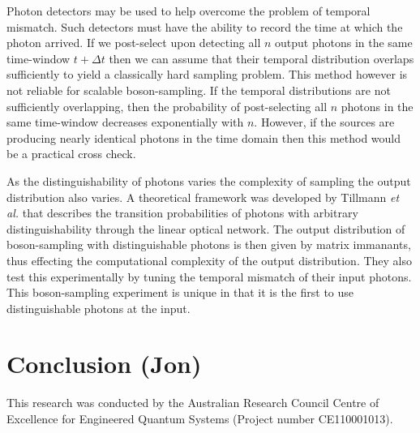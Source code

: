 \documentclass[aps,pra,twocolumn,amsmath,amssymb,nofootinbib,superscriptaddress]{revtex4}
\begin{document}
Photon detectors may be used to help overcome the problem of temporal mismatch. Such detectors must have the ability to record the time at which the photon arrived. If we post-select upon detecting all $n$ output photons in the same time-window $t + \Delta t$ then we can assume that their temporal distribution overlaps sufficiently to yield a classically hard sampling problem. This method however is not reliable for scalable boson-sampling. If the temporal distributions are not sufficiently overlapping, then the probability of post-selecting all $n$ photons in the same time-window decreases exponentially with $n$. However, if the sources are producing nearly identical photons in the time domain then this method would be a practical cross check.

As the distinguishability of photons varies the complexity of sampling the output distribution also varies. A theoretical framework was developed by Tillmann \emph{et al.} \cite{bib:tillmann2014BS} that 
describes the transition probabilities of photons with arbitrary distinguishability through the linear optical network. The output distribution of boson-sampling with distinguishable photons is then given by matrix immanants, thus effecting the computational complexity of the output distribution. They also test this experimentally by tuning the temporal mismatch of their input photons. This boson-sampling experiment is unique in that it is the first to use distinguishable photons at the input. 

\section{Conclusion (Jon)}

%
%

\begin{acknowledgments}
This research was conducted by the Australian Research Council Centre of Excellence for Engineered Quantum Systems (Project number CE110001013).
\end{acknowledgments}

%
%


\end{document}
